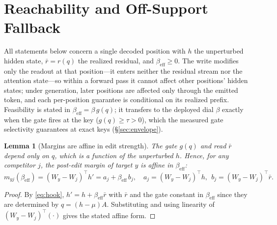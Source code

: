 \documentclass[11pt]{article}
\newtheorem{lemma}{Lemma}
\theoremstyle{remark}
\begin{document}
\section{Reachability and Off-Support Fallback}
\label{sec:theory}

All statements below concern a single decoded position with $h$ the unperturbed
hidden state, $\bar r=r(q)$ the realized residual, and $\beta_{\mathrm{eff}}\ge 0$.
The write modifies only the readout at that position---it enters neither the
residual stream nor the attention state---so within a forward pass it cannot
affect other positions' hidden states; under generation, later positions are
affected only through the emitted token, and each per-position guarantee is
conditional on its realized prefix. Feasibility is stated in
$\beta_{\mathrm{eff}}=\beta\,g(q)$; it transfers to the deployed dial $\beta$
exactly when the gate fires at the key ($g(q)\ge\tau>0$), which the measured gate
selectivity guarantees at exact keys (\S\ref{sec:envelope}).

\begin{lemma}[Margins are affine in edit strength]
\label{lem:affine}
The gate $g(q)$ and read $\bar r$ depend only on $q$, which is a function of the
unperturbed $h$. Hence, for any competitor $j$, the post-edit margin of target
$y$ is affine in $\beta_{\mathrm{eff}}$:
\[
m_{yj}(\beta_{\mathrm{eff}}) = (W_y-W_j)^{\top}h' = a_j + \beta_{\mathrm{eff}}\,b_j,
\quad a_j=(W_y-W_j)^{\top}h,\ \ b_j=(W_y-W_j)^{\top}\bar r .
\]
\end{lemma}
\begin{proof}
By \eqref{eq:hook}, $h'=h+\beta_{\mathrm{eff}}\bar r$ with $\bar r$ and the gate
constant in $\beta_{\mathrm{eff}}$ since they are determined by $q=(h-\mu)A$.
Substituting and using linearity of $(W_y-W_j)^{\top}(\cdot)$ gives the stated
affine form.
\end{proof}
\end{document}
